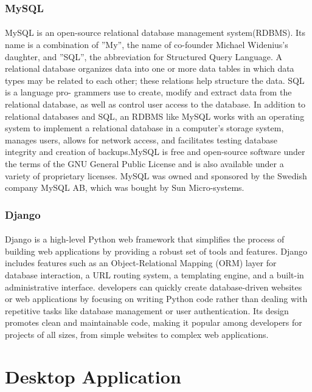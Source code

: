 \subsubsection{MySQL}
\paragraph{} MySQL is an open-source relational database management system(RDBMS). Its name is a combination of ”My”, the name of co-founder Michael Widenius’s daughter, and ”SQL”, the abbreviation for Structured Query Language. A relational database organizes data into one or more data tables in which data types may be related to each other; these relations help structure the data. SQL is a language pro- grammers use to create, modify and extract data from the relational database, as well as control user access to the database. In addition to relational databases and SQL,
an RDBMS like MySQL works with an operating system to implement a relational database in a computer’s storage system, manages users, allows for network access, and facilitates testing database integrity and creation of backups.MySQL is free and open-source software under the terms of the GNU General Public License and is also available under a variety of proprietary licenses. MySQL was owned and sponsored by the Swedish company MySQL AB, which was bought by Sun Micro-systems.

\subsubsection{Django}
\paragraph{} Django is a high-level Python web framework that simplifies the process of building web applications by providing a robust set of tools and features. Django includes features such as an Object-Relational Mapping (ORM) layer for database interaction, a URL routing system, a templating engine, and a built-in administrative interface. developers can quickly create database-driven websites or web applications by focusing on writing Python code rather than dealing with repetitive tasks like database management or user authentication. Its design promotes clean and maintainable code, making it popular among developers for projects of all sizes, from simple websites to complex web applications.


\section{Desktop Application}
